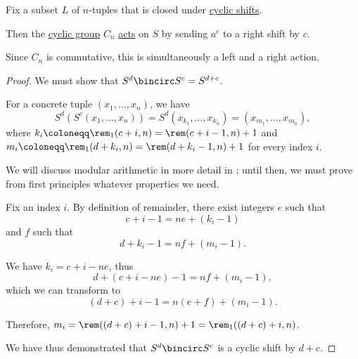 \begin{proposition}\label{thm:cyclic_shift_is_action}
  Fix a subset \( L \) of \( n \)-tuples that is closed under \hyperref[def:cyclic_shift]{cyclic shifts}.

  Then the \hyperref[def:cyclic_group]{cyclic group} \( C_n \) \hyperref[def:group_action]{acts} on \( S \) by sending \( a^c \) to a right shift by \( c \).
\end{proposition}
\begin{comments}
  \item Since \( C_n \) is commutative, this is simultaneously a left and a right action.
\end{comments}
\begin{proof}
  We must show that \( S^d \bincirc S^c = S^{d + c} \).

  For a concrete tuple \( (x_1, \ldots, x_n) \), we have
  \begin{equation*}
    S^d(S^c(x_1, \ldots, x_n)) = S^d(x_{k_1}, \ldots, x_{k_n}) = (x_{m_1}, \ldots, x_{m_n}),
  \end{equation*}
  where \( k_i \coloneqq \rem_1(c + i, n) = \rem(c + i - 1, n) + 1 \) and \( m_i \coloneqq \rem_1(d + k_i, n) = \rem(d + k_i - 1, n) + 1 \) for every index \( i \).

  We will discuss modular arithmetic in more detail in ; until then, we must prove from first principles whatever properties we need.

  Fix an index \( i \). By definition of remainder, there exist integers \( e \) such that
  \begin{equation*}
    c + i - 1 = ne + (k_i - 1)
  \end{equation*}
  and \( f \) such that
  \begin{equation*}
    d + k_i - 1 = nf + (m_i - 1).
  \end{equation*}

  We have \( k_i = c + i - ne \), thus
  \begin{equation*}
    d + (c + i - ne) - 1 = nf + (m_i - 1),
  \end{equation*}
  which we can transform to
  \begin{equation*}
    (d + c) + i - 1 = n(e + f) + (m_i - 1).
  \end{equation*}

  Therefore, \( m_i = \rem((d + c) + i - 1, n) + 1 = \rem_1((d + c) + i, n) \).

  We have thus demonstrated that \( S^d \bincirc S^c \) is a cyclic shift by \( d + c \).
\end{proof}


